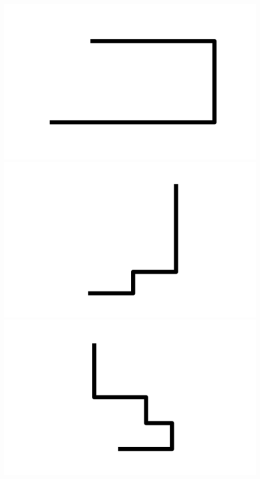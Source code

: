 \documentclass[]{report}
\begin{document}
\includegraphics[scale=.1]{pictures/21/state_cluster_shapes_475.pdf} 
\includegraphics[scale=.1]{pictures/21/state_cluster_shapes_476.pdf} 
\includegraphics[scale=.1]{pictures/21/state_cluster_shapes_477.pdf} 
\end{document}
